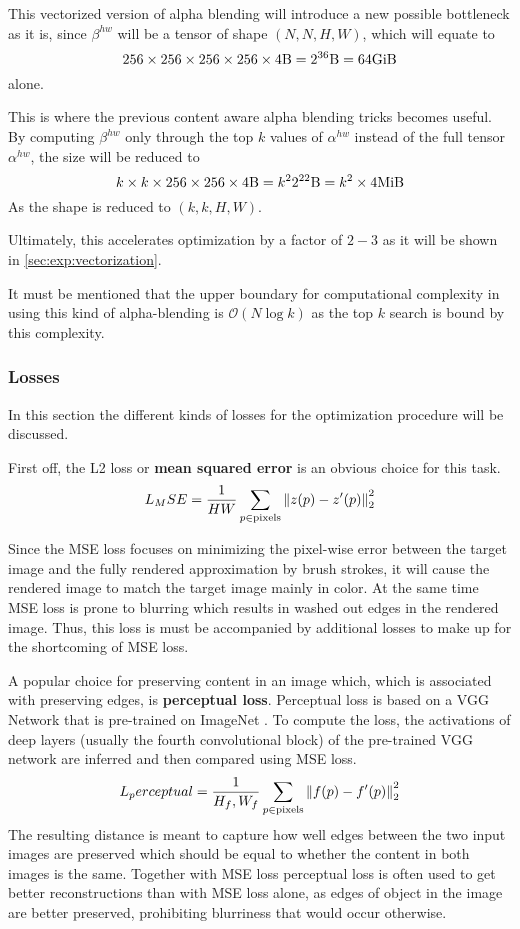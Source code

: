 This vectorized version of alpha blending will introduce a new possible bottleneck
as it is, since $\beta^{hw}$ will be a tensor of shape $(N, N, H, W)$, which will
equate to
$$
256 \times 256 \times 256 \times 256 \times 4 \si{\byte} = 2^{36}\si{\byte} = 64\si{\gibi\byte}
$$
alone.

This is where the previous content aware alpha blending tricks becomes useful.
By computing $\beta^{hw}$ only through the top $k$ values of $\alpha^{hw}$ instead
of the full tensor $\alpha^{hw}$, the size will be reduced to
$$
k \times k \times 256 \times 256 \times 4 \si{\byte} = k^2 2^{22}\si{\byte} = k^2 \times 4\si{\mebi\byte}
$$
As the shape is reduced to $(k, k, H, W)$.

Ultimately, this accelerates optimization by a factor of $2-3$ as it will be shown
in \ref{sec:exp:vectorization}.

It must be mentioned that the upper boundary for computational complexity in using
this kind of alpha-blending is $\mathcal{O}(N \log k)$ as the top $k$ search is
bound by this complexity.

\subsubsection{Losses}

In this section the different kinds of losses for the optimization procedure will
be discussed.

First off, the L2 loss or \textbf{mean squared error} is an obvious choice for this task.
\begin{align}
    L_MSE = \frac{1}{HW} \sum_{p \in \text{pixels}} \left\lVert z(p) - z'(p)\right\rVert_2^2
\end{align}

Since the MSE loss focuses on minimizing the pixel-wise error between the
target image and the fully rendered approximation by brush strokes, it will cause the
rendered image to match the target image mainly in color.
At the same time MSE loss is prone to blurring which results in washed out edges
in the rendered image.
Thus, this loss is must be accompanied by additional losses to make up for the shortcoming
of MSE loss.

A popular choice for preserving content in an image which, which is associated with
preserving edges, is \textbf{perceptual loss}.
Perceptual loss is based on a VGG Network \cite{VGG} that is pre-trained on ImageNet \cite{ImageNet}.
To compute the loss, the activations of deep layers (usually the fourth convolutional
block) of the pre-trained VGG network are inferred and then compared using MSE loss.
\begin{align}
    L_perceptual = \frac{1}{H_f, W_f} \sum_{p \in \text{pixels}} \left\lVert f(p) - f'(p)\right\rVert_2^2
\end{align}
The resulting distance is meant to capture how well edges between the two input images
are preserved which should be equal to whether the content in both images is the same.
Together with MSE loss perceptual loss is often used to get better reconstructions
than with MSE loss alone, as edges of object in the image are better preserved, prohibiting
blurriness that would occur otherwise.

